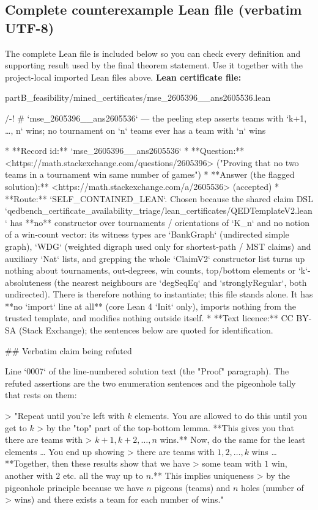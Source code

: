 \documentclass[11pt]{article}
\begin{document}
\subsection*{Complete counterexample Lean file (verbatim UTF-8)}
The complete Lean file is included below so you can check every definition and supporting result used by the final theorem statement. Use it together with the project-local imported Lean files above.
\textbf{Lean certificate file:}
\begin{Vsrc}
partB_feasibility/mined_certificates/mse_2605396__ans2605536.lean
\end{Vsrc}
\begin{Vlean}
/-!
# `mse_2605396__ans2605536` — the peeling step asserts teams with `k+1, …, n` wins;
  no tournament on `n` teams ever has a team with `n` wins

* **Record id:** `mse_2605396__ans2605536`
* **Question:** <https://math.stackexchange.com/questions/2605396>
  ("Proving that no two teams in a tournament win same number of games")
* **Answer (the flagged solution):** <https://math.stackexchange.com/a/2605536> (accepted)
* **Route:** `SELF_CONTAINED_LEAN`.  Chosen because the shared claim DSL
  `qedbench_certificate_availability_triage/lean_certificates/QEDTemplateV2.lean` has **no**
  constructor over tournaments / orientations of `K_n` and no notion of a win-count vector:
  its witness types are `BankGraph` (undirected simple graph), `WDG` (weighted digraph used
  only for shortest-path / MST claims) and auxiliary `Nat` lists, and grepping the whole
  `ClaimV2` constructor list turns up nothing about tournaments, out-degrees, win counts,
  top/bottom elements or `k`-absoluteness (the nearest neighbours are `degSeqEq` and
  `stronglyRegular`, both undirected).  There is therefore nothing to instantiate; this file
  stands alone.  It has **no `import` line at all** (core Lean 4 `Init` only), imports nothing
  from the trusted template, and modifies nothing outside itself.
* **Text licence:** CC BY-SA (Stack Exchange); the sentences below are quoted for
  identification.

## Verbatim claim being refuted

Line `0007` of the line-numbered solution text (the "Proof" paragraph).  The refuted
assertions are the two enumeration sentences and the pigeonhole tally that rests on them:

> "Repeat until you're left with $k$ elements. You are allowed to do this until you get to $k$
> by the "top" part of the top-bottom lemma. **This gives you that there are teams with
> $k+1, k+2, \dots, n$ wins.** Now, do the same for the least elements … You end up showing
> there are teams with $1, 2, \dots, k$ wins … **Together, then these results show that we have
> some team with $1$ win, another with $2$ etc. all the way up to $n$.** This implies uniqueness
> by the pigeonhole principle because we have $n$ pigeons (teams) and $n$ holes (number of
> wins) and there exists a team for each number of wins."


\end{Vlean}
\end{document}
